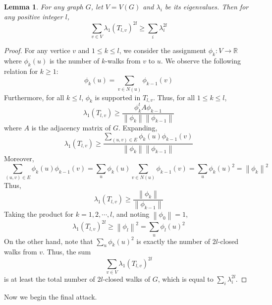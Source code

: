 \documentclass{article}
\newcommand{\norm}[1]{\left\lVert#1\right\rVert}
\theoremstyle{definition} %
\theoremstyle{plain} %
\newtheorem{lemma}{Lemma}
\begin{document}
\begin{lemma}
For any graph $G$, let $V = V(G)$ and $\lambda_i$ be its eigenvalues. Then for any positive integer $l$,
$$\sum_{v\in V}\lambda_1(T_{l,v})^{2l} \geq \sum_i \lambda_i^{2l}$$
\end{lemma}
\begin{proof}
For any vertice $v$ and $1\leq k\leq l$, we consider the assignment $\phi_k:V\to\mathbb{R}$ where $\phi_k(u)$ is the number of $k$-walks from $v$ to $u$. We observe the following relation for $k\geq 1$:
$$\phi_k(u) = \sum_{v\in N(u)} \phi_{k-1}(v)$$
Furthermore, for all $k \leq l$, $\phi_k$ is supported in $T_{l,v}$. Thus, for all $1\leq k\leq l$,
$$\lambda_1(T_{l,v}) \geq \frac{\phi_k^tA\phi_{k-1}}{\norm{\phi_k}\norm{\phi_{k-1}}}$$
where $A$ is the adjacency matrix of $G$. Expanding,
$$\lambda_1(T_{l,v}) \geq \frac{\sum_{(u,v)\in E} \phi_k(u)\phi_{k-1}(v)}{\norm{\phi_k}\norm{\phi_{k-1}}}$$
Moreover,
$$\sum_{(u,v)\in E} \phi_k(u)\phi_{k-1}(v) = \sum_{u}\phi_k(u)\sum_{v\in N(u)} \phi_{k-1}(v) = \sum_{u}\phi_k(u)^2 = \norm{\phi_k}^2$$
Thus,
$$\lambda_1(T_{l,v}) \geq \frac{\norm{\phi_k}}{\norm{\phi_{k-1}}}$$
Taking the product for $k = 1,2,\cdots, l$, and noting $\norm{\phi_0} = 1$,
$$\lambda_1(T_{l,v})^{2l} \geq \norm{\phi_l}^2 = \sum_{u}\phi_l(u)^2$$
On the other hand, note that $\sum_{u}\phi_k(u)^2$ is exactly the number of $2l$-closed walks from $v$. Thus, the sum
$$\sum_{v\in V}\lambda_1(T_{l,v})^{2l}$$
is at least the total number of $2l$-closed walks of $G$, which is equal to $\sum_i \lambda_i^{2l}$.
\end{proof}
\clearpage
Now we begin the final attack. 
\end{document}
